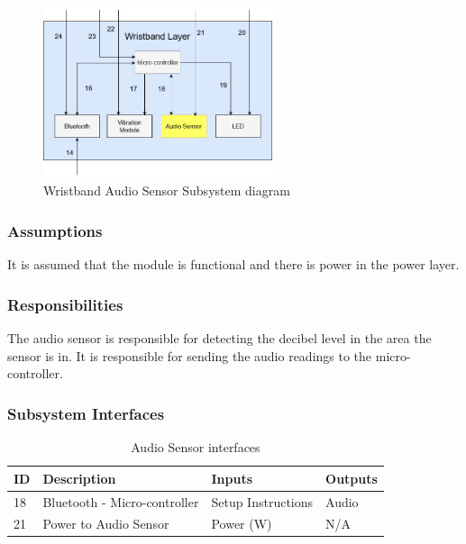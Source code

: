 \begin{figure}[h!]
	\centering
 	\includegraphics[width=0.60\textwidth]{images/wristband-audio.jpg}
 \caption{Wristband Audio Sensor Subsystem diagram}
\end{figure}

\subsubsection{Assumptions}
It is assumed that the module is functional and there is power in the power layer.

\subsubsection{Responsibilities}
The audio sensor is responsible for detecting the decibel level in the area the sensor is in. It is responsible for sending the audio readings to the micro-controller.

\subsubsection{Subsystem Interfaces}

\begin {table}[H]
\caption {Audio Sensor interfaces} 
\begin{center}
    \begin{tabular}{ | p{1cm} | p{6cm} | p{3cm} | p{3cm} |}
    \hline
    ID & Description & Inputs & Outputs \\ \hline
    18 & Bluetooth - Micro-controller & Setup Instructions & Audio \\ \hline
    21 & Power to Audio Sensor & Power (W) &  N/A \\ \hline
    \end{tabular}
\end{center}
\end{table}


